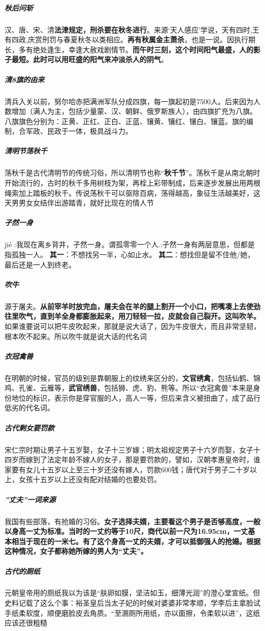 \documentclass[UTF8,a4paper,12pt]{ctexbook}
\begin{document}
		\subparagraph{秋后问斩}汉、唐、宋、清\textbf{法津规定，刑杀要在秋冬进行}。来源‘天人感应’学说，天有四时,王有四政,庆赏刑罚与春夏秋冬以类相应。\textbf{再有秋属金主萧杀}，也是一说。因执行期长，多有绝处逢生，幸逢大赦戏剧情节。\textbf{而午时三刻，这个时间阳气最盛，人的影子最短。此时可以用旺盛的阳气来冲淡杀人的阴气}。
		
		\subparagraph{清8旗的由来}清兵入关以前，努尔哈赤把满洲军队分成四旗，每一旗起初是7500人。后来因为人数增加（满人为主，包括少量蒙、汉、朝鲜、俄罗斯族人），由四旗扩充为八旗。八旗旗色分别为：正黄、正红、正白、正蓝、镶黄、镶红、镶白、镶蓝。旗的编制，合军政、民政于一体，极具战斗力。
		
		\subparagraph{清明节荡秋千}荡秋千是古代清明节的传统习俗，所以清明节也称“\textbf{秋千节}”。荡秋千是从南北朝时开始流行的，古时的秋千多用树枝为架，再栓上彩带制成，后来逐步发展出用两根绳索加上踏板的秋千。传说荡秋千可以驱除百病，荡得越高，象征生活越美好，这天男男女女结伴出游踏青，就好比现在的情人节
		
		\subparagraph{孑然一身}jié  :我现在离乡背井，孑然一身。谓孤零零一个人.:孑然一身有两层意思，但都是指孤独一人。 \textbf{其一}：不想找另一半，心如止水。\textbf{ 其二}：想找但是留不住他/她，最后还是一人到终老。
		
		\subparagraph{吹牛}源于屠夫。\textbf{从前宰羊时放完血，屠夫会在羊的腿上割开一个小口，把嘴凑上去使劲往里吹气，直到羊全身都膨胀起来，用刀轻轻一拉，皮就会自己裂开。这叫吹羊。}如果谁要说可以把牛皮吹起来，那就是说大话了，因为牛皮很大，而且非常坚韧，根本吹不起来。所以吹牛就是说大话的代名词
		
		\subparagraph{衣冠禽兽}在明朝的时候，官员的级别是靠朝服上的纹绣来区分的，\textbf{文官绣禽}，包括仙鹤、锦鸡、孔雀、云雁等，\textbf{武官绣兽}，包括狮、虎、豹、熊等。所以“衣冠禽兽”本来是身份地位的标识，表示你是穿官服的人，高人一等，但后来含义被扭曲了，成了品行低劣的代名词。
		
		\subparagraph{古代剩女要罚款}宋仁宗时期让男子十五岁娶，女子十三岁嫁；明太祖规定男子十六岁而娶，女子十四岁而嫁到了法定年龄不嫁人的女子，那是要罚款的，譬如，汉朝孝惠皇帝时，谁家要有女儿十五岁以上至三十岁还没有嫁人，罚款600钱；唐代对于男子二十岁以上，女孩十五岁以上还没有配对结婚的也要处罚。
		
		\subparagraph{”丈夫”一词来源}我国有些部落，有抢婚的习俗。\textbf{女子选择夫婿，主要看这个男子是否够高度，一般以身高一丈为标准。当时的一丈约等于10尺，商代以前一尺为16.95cm，一丈基本相当于现在的一米七。有了这个身高一丈的夫婿，才可以抵御强人的抢婚。根据这种情况，女子都称她所嫁的男人为“丈夫”。}
		
		\subparagraph{古代的厕纸}元朝皇帝用的厕纸我以为该是“肤卵如膜，坚洁如玉，细薄光润”的澄心堂宣纸。但史料记载了这么个事：裕圣皇后当太子妃的时候对婆婆非常孝顺，学李后主拿脸试手纸柔软度，顺便磨脸皮去角质。“至溷厕所用纸，亦以面擦，令柔软以进”，这纸应该还很粗糙
		
\end{document}
